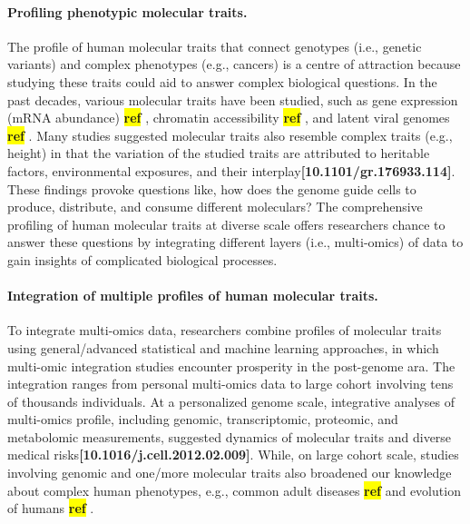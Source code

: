 \documentclass[12pt,usletter,fancy]{elegantbook}
\newcommand{\reqref}[1][ref]{
  \colorbox{yellow}{\textbf{#1}}
}
\begin{document}
\paragraph*{Profiling phenotypic molecular traits.}
The profile of human molecular traits that connect genotypes (i.e., genetic variants) and complex phenotypes (e.g., cancers) is a centre of attraction because studying these traits could aid to answer complex biological questions.
In the past decades, various molecular traits have been studied, such as gene expression (mRNA abundance) \reqref, chromatin accessibility \reqref, and latent viral genomes \reqref.
Many studies suggested molecular traits also resemble complex traits (e.g., height) in that the variation of the studied traits are attributed to heritable factors, environmental exposures, and their interplay\textbf{[10.1101/gr.176933.114]}.
These findings provoke questions like, how does the genome guide cells to produce, distribute, and consume different moleculars?
The comprehensive profiling of human molecular traits at diverse scale offers researchers chance to answer these questions by integrating different layers (i.e., multi-omics) of data to gain insights of complicated biological processes.

\paragraph*{Integration of multiple profiles of human molecular traits.}
To integrate multi-omics data, researchers combine profiles of molecular traits using general/advanced statistical and machine learning approaches, in which multi-omic integration studies encounter prosperity in the post-genome ara.
The integration ranges from personal multi-omics data to large cohort involving tens of thousands individuals.
At a personalized genome scale, integrative analyses of multi-omics profile, including genomic, transcriptomic, proteomic, and metabolomic measurements, suggested dynamics of molecular traits and diverse medical risks\textbf{[10.1016/j.cell.2012.02.009]}.
While, on large cohort scale, studies involving genomic and one/more molecular traits also broadened our knowledge about complex human phenotypes, e.g., common adult diseases \reqref and evolution of humans \reqref.
\end{document}
